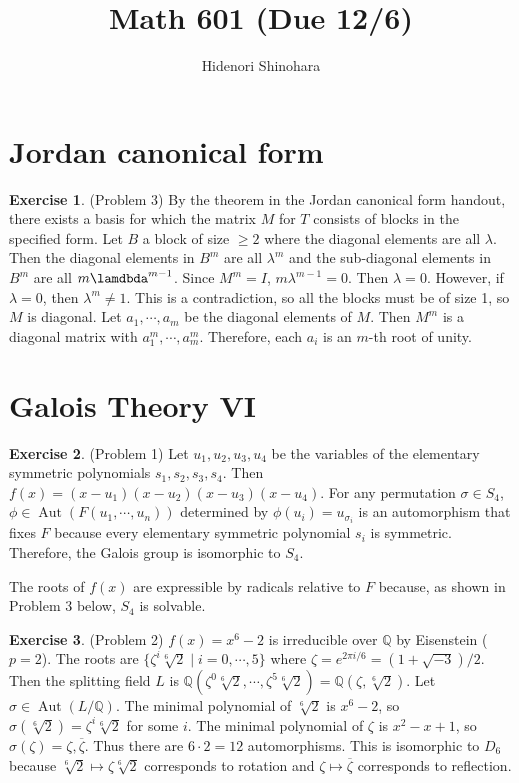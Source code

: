 \documentclass[12pt, psamsfonts]{amsart}
\theoremstyle{definition}
\newtheorem*{exer}{Exercise}
\theoremstyle{remark}
\DeclareMathOperator{\Aut}{Aut}
\numberwithin{equation}{section}
\begin{document}
\title{Math 601 (Due 12/6)}
\author{Hidenori Shinohara}
\maketitle

\tableofcontents

\section{Jordan canonical form}

\begin{exer}{(Problem 3)}
  By the theorem in the Jordan canonical form handout, there exists a basis for which the matrix $M$ for $T$ consists of blocks in the specified form.
  Let $B$ a block of size $\geq 2$ where the diagonal elements are all $\lambda$.
  Then the diagonal elements in $B^m$ are all $\lambda^m$ and the sub-diagonal elements in $B^m$ are all $m\lamdbda^{m - 1}$.
  Since $M^m = I$, $m\lambda^{m - 1} = 0$.
  Then $\lambda = 0$.
  However, if $\lambda = 0$, then $\lambda^m \ne 1$.
  This is a contradiction, so all the blocks must be of size 1, so $M$ is diagonal.
  Let $a_1, \cdots, a_m$ be the diagonal elements of $M$.
  Then $M^m$ is a diagonal matrix with $a_1^m, \cdots, a_m^m$.
  Therefore, each $a_i$ is an $m$-th root of unity.
\end{exer}

\section{Galois Theory VI}

\begin{exer}{(Problem 1)}
  Let $u_1, u_2, u_3, u_4$ be the variables of the elementary symmetric polynomials $s_1, s_2, s_3, s_4$.
  Then $f(x) = (x - u_1)(x - u_2)(x - u_3)(x - u_4)$.
  For any permutation $\sigma \in S_4$, $\phi \in \Aut(F(u_1, \cdots, u_n))$ determined by $\phi(u_i) = u_{\sigma_i}$ is an automorphism that fixes $F$ because every elementary symmetric polynomial $s_i$ is symmetric.
  Therefore, the Galois group is isomorphic to $S_4$.

  The roots of $f(x)$ are expressible by radicals relative to $F$ because, as shown in Problem 3 below, $S_4$ is solvable.
\end{exer}

\begin{exer}{(Problem 2)}
  $f(x) = x^6 - 2$ is irreducible over $\mathbb{Q}$ by Eisenstein ($p = 2$).
  The roots are $\{ \zeta^{i} \sqrt[6]{2} \mid i = 0, \cdots, 5 \}$ where $\zeta = e^{2\pi i / 6} = (1 + \sqrt{-3}) / 2$.
  Then the splitting field $L$ is $\mathbb{Q}(\zeta^0\sqrt[6]{2}, \cdots, \zeta^5\sqrt[6]{2}) = \mathbb{Q}(\zeta, \sqrt[6]{2})$.
  Let $\sigma \in \Aut(L/\mathbb{Q})$.
  The minimal polynomial of $\sqrt[6]{2}$ is $x^6 - 2$, so $\sigma(\sqrt[6]{2}) = \zeta^i\sqrt[6]{2}$ for some $i$.
  The minimal polynomial of $\zeta$ is $x^2 - x + 1$, so $\sigma(\zeta) = \zeta, \overline{\zeta}$.
  Thus there are $6 \cdot 2 = 12$ automorphisms.
  This is isomorphic to $D_6$ because $\sqrt[6]{2} \mapsto \zeta\sqrt[6]{2}$ corresponds to rotation and $\zeta \mapsto \overline{\zeta}$ corresponds to reflection.
\end{exer}
\end{document}
